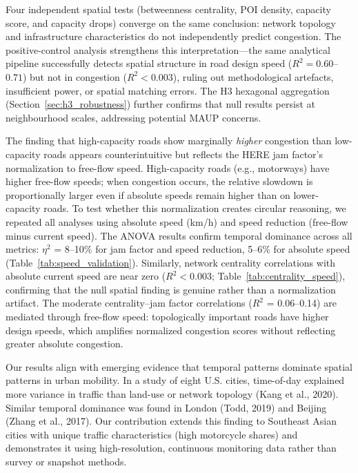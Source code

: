 \documentclass[12pt,a4paper]{article}
\begin{document}
Four independent spatial tests (betweenness centrality, POI density, capacity score, and capacity drops) converge on the same conclusion: network topology and infrastructure characteristics do not independently predict congestion. The positive-control analysis strengthens this interpretation---the same analytical pipeline successfully detects spatial structure in road design speed ($R^2 = 0.60$--$0.71$) but not in congestion ($R^2 < 0.003$), ruling out methodological artefacts, insufficient power, or spatial matching errors. The H3 hexagonal aggregation (Section~\ref{sec:h3_robustness}) further confirms that null results persist at neighbourhood scales, addressing potential MAUP concerns.

The finding that high-capacity roads show marginally \textit{higher} congestion than low-capacity roads appears counterintuitive but reflects the HERE jam factor's normalization to free-flow speed. High-capacity roads (e.g., motorways) have higher free-flow speeds; when congestion occurs, the relative slowdown is proportionally larger even if absolute speeds remain higher than on lower-capacity roads. To test whether this normalization creates circular reasoning, we repeated all analyses using absolute speed (km/h) and speed reduction (free-flow minus current speed). The ANOVA results confirm temporal dominance across all metrics: $\eta^2$ = 8--10\% for jam factor and speed reduction, 5--6\% for absolute speed (Table~\ref{tab:speed_validation}). Similarly, network centrality correlations with absolute current speed are near zero ($R^2 < 0.003$; Table~\ref{tab:centrality_speed}), confirming that the null spatial finding is genuine rather than a normalization artifact. The moderate centrality--jam factor correlations ($R^2$ = 0.06--0.14) are mediated through free-flow speed: topologically important roads have higher design speeds, which amplifies normalized congestion scores without reflecting greater absolute congestion.

Our results align with emerging evidence that temporal patterns dominate spatial patterns in urban mobility. In a study of eight U.S. cities, time-of-day explained more variance in traffic than land-use or network topology (Kang et al., 2020). Similar temporal dominance was found in London (Todd, 2019) and Beijing (Zhang et al., 2017). Our contribution extends this finding to Southeast Asian cities with unique traffic characteristics (high motorcycle shares) and demonstrates it using high-resolution, continuous monitoring data rather than survey or snapshot methods.
\end{document}
